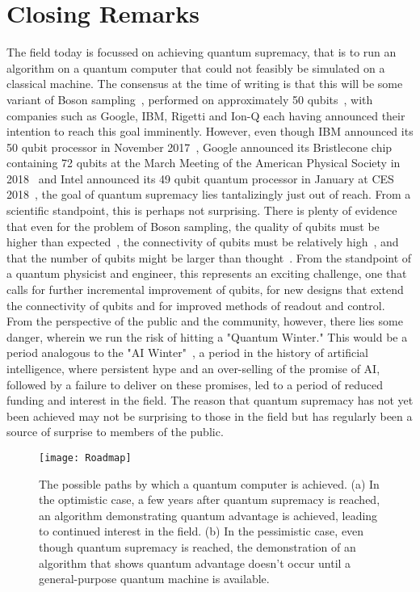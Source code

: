 \section{Closing Remarks}
The field today is focussed on achieving quantum supremacy, that is to run an algorithm on a quantum computer that could not feasibly be
simulated on a classical machine. The consensus at the time of writing is that this will be some variant of Boson sampling~\cite{Aaronson:2011},
performed on approximately 50 qubits~\cite{savage,8322045,10.1038/s41567-018-0131-y}, with companies such as Google, IBM, Rigetti and Ion-Q each having
announced their intention to reach this goal imminently. However, even though IBM announced its 50 qubit processor in November 2017~\cite{ibmq}, Google announced
its Bristlecone chip containing 72 qubits at the March Meeting of the American Physical Society in 2018~\cite{gcryocmos,Neill195} and Intel announced
its 49 qubit quantum processor in January at CES 2018~\cite{intelq}, the goal of quantum supremacy lies tantalizingly just out of reach. From a scientific standpoint,
this is perhaps not surprising. There is plenty of evidence that even for the problem of Boson sampling, the quality of qubits must be higher
than expected~\cite{PhysRevX.6.021039,PhysRevLett.117.080501}, the connectivity of qubits must be relatively high~\cite{s41567-018-0124-x},
and that the number of qubits might be larger than thought~\cite{2017arXiv171005867P}.
From the standpoint of a quantum physicist and engineer, this represents an exciting challenge, one that calls for further incremental improvement of qubits,
for new designs that extend the connectivity of qubits and for improved methods of readout and control. From the perspective of the public and the community, however,
there lies some danger, wherein we run the risk of hitting a "Quantum Winter." This would be a period analogous to the "AI Winter"~\cite{crevier1993ai},
a period in the history of artificial intelligence, where persistent hype and an over-selling of the promise of AI, followed by a failure to deliver on these promises,
led to a period of reduced funding and interest in the field. The reason that quantum supremacy has not yet been achieved may not be surprising to those in the
field but has regularly been a source of surprise to members of the public.

\begin{figure}
    \texttt{[image: Roadmap]}
    \caption[Roadmap to a quantum computer]{\label{fig:roadmap} The possible paths by which a quantum computer is achieved. (a) In the optimistic case,
    a few years after quantum supremacy is reached, an algorithm demonstrating quantum advantage is achieved, leading to continued interest in the field. (b) In the pessimistic case,
    even though quantum supremacy is reached, the demonstration of an algorithm that shows quantum advantage doesn't occur until a general-purpose quantum machine is available.}
\end{figure}

